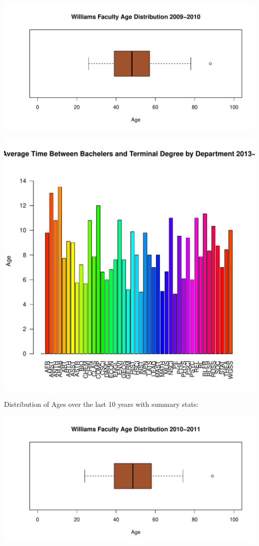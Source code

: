 \documentclass[12pt,a4paper]{article}\usepackage[]{graphicx}\usepackage[]{color}
\makeatletter
\def\maxwidth{ %
  \ifdim\Gin@nat@width>\linewidth
    \linewidth
  \else
    \Gin@nat@width
  \fi
}
\newenvironment{knitrout}{}{} %
\theoremstyle{definition}
\makeatother
\begin{document}
\begin{knitrout}
\color{fgcolor}
\includegraphics[width=\maxwidth]{figure/unnamed-chunk-25-1} 

\includegraphics[width=\maxwidth]{figure/unnamed-chunk-25-2} 

\end{knitrout}

Distribution of Ages over the last 10 years with summary stats:

\begin{knitrout}
\color{fgcolor}
\includegraphics[width=\maxwidth]{figure/unnamed-chunk-26-1} 

\end{knitrout}
\end{document}
